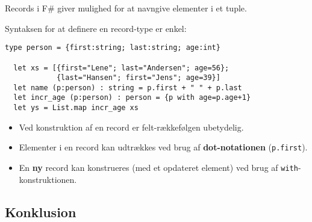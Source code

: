 \documentclass[rgb]{beamer}
\begin{document}
\begin{frame}[fragile]
\begin{footnotesize}


  Records i F\# giver mulighed for at navngive elementer i et tuple.

  \vspace{1ex}

  Syntaksen for at definere en record-type er enkel:

\begin{lstlisting}[numbers=none,frame=none,mathescape]
  type person = {first:string; last:string; age:int}

  let xs = [{first="Lene"; last="Andersen"; age=56};
            {last="Hansen"; first="Jens"; age=39}]
  let name (p:person) : string = p.first + " " + p.last
  let incr_age (p:person) : person = {p with age=p.age+1}
  let ys = List.map incr_age xs
\end{lstlisting}

  \vspace{1ex}

  \begin{itemize}
  \item Ved konstruktion af en record er felt-rækkefølgen ubetydelig.
  \item Elementer i en record kan udtrækkes ved brug af \textbf{dot-notationen} (\lstinline{p.first}).
  \item En \textbf{ny} record kan konstrueres (med et opdateret
    element) ved brug af \lstinline{with}-konstruktionen.
  \end{itemize}

\end{footnotesize}
\end{frame}

\subsection*{Konklusion}
\begin{frame}[fragile]

  \vspace{3mm}
  \tableofcontents
\end{frame}
\end{document}
